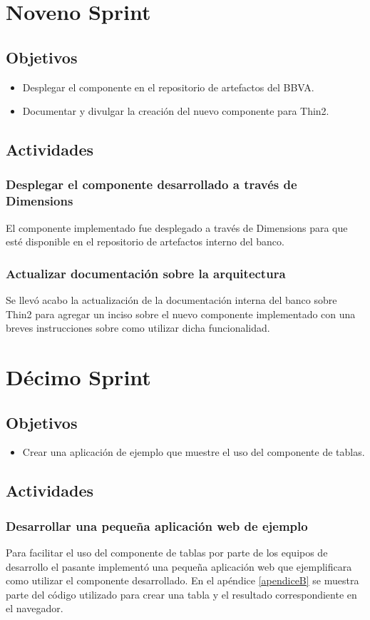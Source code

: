 \section{Noveno Sprint}

\subsection{Objetivos}
\begin{itemize}
  \item Desplegar el componente en el repositorio de artefactos del BBVA.
  \item Documentar y divulgar la creación del nuevo componente para Thin2.
\end{itemize}
\subsection{Actividades}
\subsubsection{Desplegar el componente desarrollado a través de Dimensions}
El componente implementado fue desplegado a través de Dimensions para que esté
disponible en el repositorio de artefactos interno del banco.
\subsubsection{Actualizar documentación sobre la arquitectura}
Se llevó acabo la actualización de la documentación interna del banco sobre
Thin2 para agregar un inciso sobre el nuevo componente implementado con
una breves instrucciones sobre como utilizar dicha funcionalidad.

\section{Décimo Sprint}

\subsection{Objetivos}
\begin{itemize}
  \item Crear una aplicación de ejemplo que muestre el uso del componente de tablas.
\end{itemize}
\subsection{Actividades}
\subsubsection{Desarrollar una pequeña aplicación web de ejemplo}
Para facilitar el uso del componente de tablas por parte de los equipos de
desarrollo el pasante implementó una pequeña aplicación web que ejemplificara
como utilizar el componente desarrollado. En el apéndice \ref{apendiceB} se muestra parte
del código utilizado para crear una tabla y el resultado correspondiente en el navegador.
